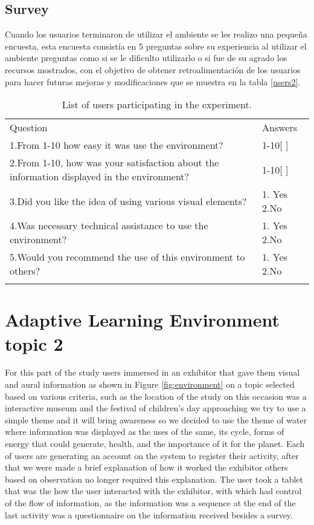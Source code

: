 \subsection{Survey}

Cuando los usuarios terminaron de utilizar el ambiente se les realizo una pequeña encuesta, esta encuesta consistía en 5 preguntas sobre su experiencia al utilizar el ambiente preguntas como si se le dificulto utilizarlo o si fue de su agrado los recursos mostrados, con el objetivo de obtener retroalimentación de los usuarios para hacer futuras mejoras y modificaciones que se muestra en la tabla \ref{users2}.
\begin{table}
\small
\centering
\captionsetup{font=footnotesize}
\caption{List of users participating in the experiment.}
\label{tab:users2} 

\small
\begin{tabular}{p{12cm} p{4cm} }
\hline\noalign{\smallskip} 
Question & Answers \\
\noalign{\smallskip}\hline\noalign{\smallskip}\hline
\small{1.From 1-10 how easy it was use the environment? } & \small{1-10[  ]} \\ \hline  
\small{2.From 1-10, how was your satisfaction about the information displayed in the environment? } & \small{1-10[  ]} \\ \hline
\small{3.Did you like the idea of using various visual elements?  } & \small{1. Yes 2.No} \\ \hline 
\small{4.Was necessary technical assistance to use the environment?   } & \small{1. Yes 2.No} \\ \hline   
\small{5.Would you recommend the use of this environment to others?  } & \small{1. Yes 2.No} \\ \hline 
\hline
\noalign{\smallskip}\hline
\end{tabular}
\end{table}

\section{Adaptive Learning Environment topic 2}
For this part of the study users immersed in an exhibitor that gave them visual and aural information as shown in Figure \ref{fig:environment} on a topic selected based on various criteria, such as the location of the study on this occasion was a interactive museum and the festival of children’s day approaching we try to use a simple theme and it will bring awareness so we decided to use the theme of water where information was displayed as the uses of the same, its cycle, forms of energy that could generate, health, and the importance of it for the planet. Each of users are generating an account on the system to register their activity, after that we were made a brief explanation of how it worked the exhibitor others based on observation no longer required this explanation. The user took a tablet that was the how the user interacted with the exhibitor, with which had control of the ﬂow of information, as the information was a sequence at the end of the last activity was a questionnaire on the information received besides a survey.


